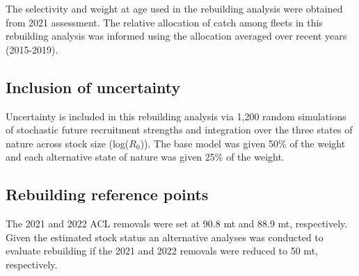 \documentclass[11pt,
  english,
  a4paper,
]{article}
\begin{document}

The selectivity and weight at age used in the rebuilding analysis were obtained from 2021 assessment. The relative allocation of catch among fleets in this rebuilding analysis was informed using the allocation averaged over recent years (2015-2019).

\leavevmode\tagmcend\tagstructend\par


\hypertarget{inclusion-of-uncertainty}{%
\subsection{Inclusion of uncertainty}\label{inclusion-of-uncertainty}}

\leavevmode\tagmcend\tagstructend


Uncertainty is included in this rebuilding analysis via 1,200 random simulations of stochastic future recruitment strengths and integration over the three states of nature across stock size (log({\(R_0\)\leavevmode\tagmcend\tagstructend})). The base model was given 50\% of the weight and each alternative state of nature was given 25\% of the weight.

\leavevmode\tagmcend\tagstructend\par


\hypertarget{rebuilding-reference-points}{%
\subsection{Rebuilding reference points}\label{rebuilding-reference-points}}

\leavevmode\tagmcend\tagstructend


The 2021 and 2022 ACL removals were set at 90.8 mt and 88.9 mt, respectively. Given the estimated stock status an alternative analyses was conducted to evaluate rebuilding if the 2021 and 2022 removals were reduced to 50 mt, respectively.

\leavevmode\tagmcend\tagstructend\par

\end{document}

